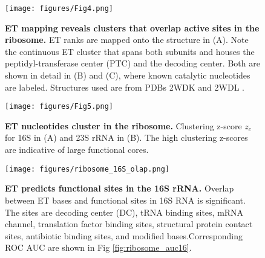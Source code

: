 \documentclass[12pt,a4paper]{report}
\begin{document}
\begin{figure}
\begin{minipage}[c][\textheight]{\textwidth}
\vspace*{-1in}
\centering
  \texttt{[image: figures/Fig4.png]}
  \caption[ET mapping reveals clusters that overlap active sites in the ribosome.]{\textbf{ET mapping reveals clusters that overlap active sites in the ribosome.} ET ranks are mapped onto the structure in (A). Note the continuous ET cluster that spans both subunits and houses the peptidyl-transferase center (PTC) and the decoding center. Both are shown in detail in (B) and (C), where known catalytic nucleotides are labeled. Structures used are from PDBs 2WDK and 2WDL \cite{Voorhees2009}.}
  \label{fig:ribosome_map}
  \end{minipage}
\end{figure}

\begin{figure}
\begin{minipage}[c][\textheight]{\textwidth}
\centering
 \vspace{-4in}
  \texttt{[image: figures/Fig5.png]}
  \caption[ET nucleotides cluster in the ribosome.]{\textbf{ET nucleotides cluster in the ribosome.} Clustering z-score $z_{c}$ for 16S in (A) and 23S rRNA in (B). The high clustering z-scores are indicative of large functional cores.}
  \label{fig:ribosome_clustering}
\end{minipage}
\end{figure}



\begin{figure}
\begin{minipage}[c][\textheight]{\textwidth}
\centering
 \vspace{-1.5in}
  \texttt{[image: figures/ribosome\_16S\_olap.png]}
\caption[ET predicts functional sites in the ribosome (16S rRNA).]{\textbf{ET predicts functional sites in the 16S rRNA.} Overlap between ET bases and functional sites in 16S RNA is significant. The sites are decoding center (DC), tRNA binding sites, mRNA channel, translation factor binding sites, structural protein contact sites, antibiotic binding sites, and modified bases.Corresponding ROC AUC are shown in Fig \ref{fig:ribosome_auc16}.}
 \label{fig:ribosome_olap16}
\end{minipage}
\end{figure}
\end{document}
